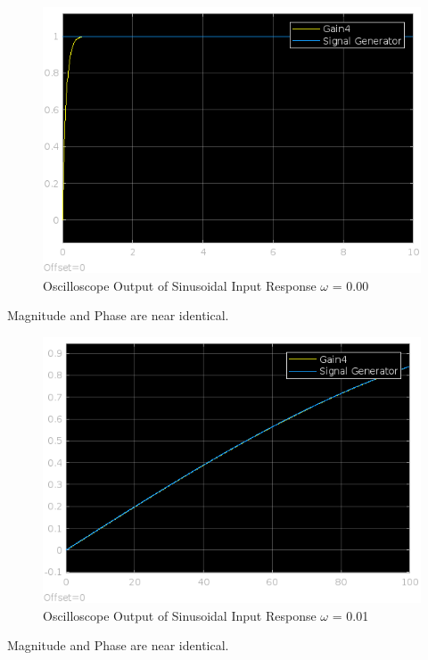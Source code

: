 \documentclass[12pt]{article}
\begin{document}
			\begin{figure}[H]
				\centering
				\includegraphics[width=1\linewidth]{"Code/Fig/sine_input_output_w_0.png"} 
				\caption{Oscilloscope Output of Sinusoidal Input Response $\omega$ = 0.00}
				\label{fig:slx_sine_input_output_w_0}
			\end{figure}	
			Magnitude and Phase are near identical.
			\begin{figure}[H]
				\centering
				\includegraphics[width=1\linewidth]{"Code/Fig/sine_input_output_w_0_01.png"} 
				\caption{Oscilloscope Output of Sinusoidal Input Response $\omega$ = 0.01}
				\label{fig:slx_sine_input_output_w_0_01}
			\end{figure}
			Magnitude and Phase are near identical.
\end{document}

